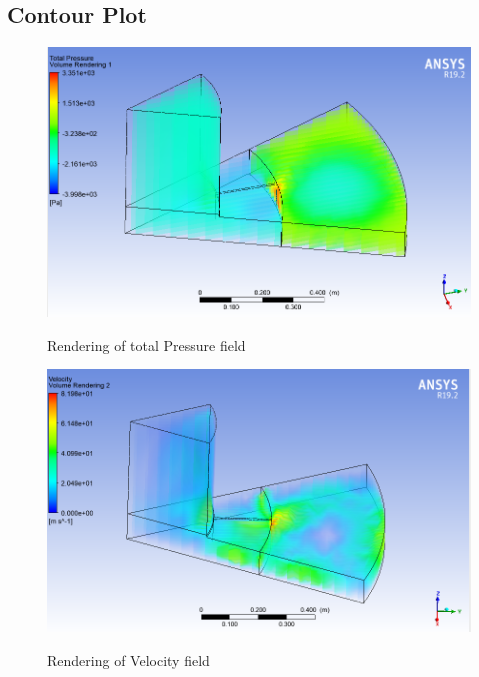 \documentclass[11pt]{article}
\begin{document}
 \subsection{Contour Plot}
 \begin{center}
 \begin{figure}[H]
 \centering
 \includegraphics[scale=.6]{totalpressure.png}\\
 \caption{Rendering of total Pressure field}
 \end{figure}
 \end{center}
 \begin{center}
 \begin{figure}[H]
 \centering
 \includegraphics[scale=.6]{velocitycontour.png}\\
 \caption{Rendering of Velocity field }
 \end{figure}
 \end{center}
\end{document}
